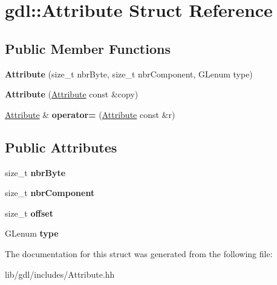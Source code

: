\hypertarget{structgdl_1_1_attribute}{}\section{gdl\+:\+:Attribute Struct Reference}
\label{structgdl_1_1_attribute}
\subsection*{Public Member Functions}
\begin{DoxyCompactItemize}
\item 
\hypertarget{structgdl_1_1_attribute_a50d4d3c9a0424c684a2c2b4745fbb2b4}{}{\bfseries Attribute} (size\+\_\+t nbr\+Byte, size\+\_\+t nbr\+Component, G\+Lenum type)\label{structgdl_1_1_attribute_a50d4d3c9a0424c684a2c2b4745fbb2b4}

\item 
\hypertarget{structgdl_1_1_attribute_ac79d60cd54c3e93193aea1c94dcba4ef}{}{\bfseries Attribute} (\hyperlink{structgdl_1_1_attribute}{Attribute} const \&copy)\label{structgdl_1_1_attribute_ac79d60cd54c3e93193aea1c94dcba4ef}

\item 
\hypertarget{structgdl_1_1_attribute_ac35d64d106cf0c2f9acb836daf7005cd}{}\hyperlink{structgdl_1_1_attribute}{Attribute} \& {\bfseries operator=} (\hyperlink{structgdl_1_1_attribute}{Attribute} const \&r)\label{structgdl_1_1_attribute_ac35d64d106cf0c2f9acb836daf7005cd}

\end{DoxyCompactItemize}
\subsection*{Public Attributes}
\begin{DoxyCompactItemize}
\item 
\hypertarget{structgdl_1_1_attribute_a70cb7692817d55628bf9d909d75f1f53}{}size\+\_\+t {\bfseries nbr\+Byte}\label{structgdl_1_1_attribute_a70cb7692817d55628bf9d909d75f1f53}

\item 
\hypertarget{structgdl_1_1_attribute_a6b584e52c6cefe965fb9a396917e0729}{}size\+\_\+t {\bfseries nbr\+Component}\label{structgdl_1_1_attribute_a6b584e52c6cefe965fb9a396917e0729}

\item 
\hypertarget{structgdl_1_1_attribute_aabcc64acb6a51b2e5508a6ff9b14b506}{}size\+\_\+t {\bfseries offset}\label{structgdl_1_1_attribute_aabcc64acb6a51b2e5508a6ff9b14b506}

\item 
\hypertarget{structgdl_1_1_attribute_a633e64f1e8e4b3dede7c23d2627896a3}{}G\+Lenum {\bfseries type}\label{structgdl_1_1_attribute_a633e64f1e8e4b3dede7c23d2627896a3}

\end{DoxyCompactItemize}


The documentation for this struct was generated from the following file\+:\begin{DoxyCompactItemize}
\item 
lib/gdl/includes/Attribute.\+hh\end{DoxyCompactItemize}
